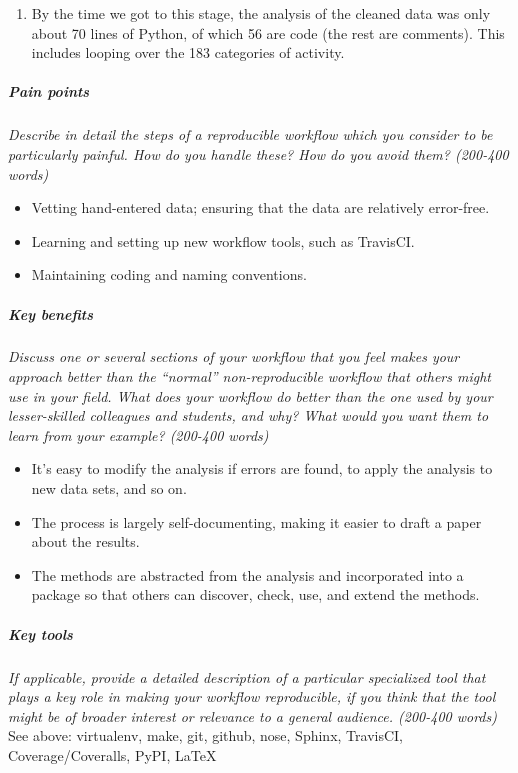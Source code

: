 \documentclass[]{article}
\begin{document}
\begin{enumerate}
  \begin{enumerate}
  \def\labelenumii{\roman{enumii}.}
  \itemsep1pt\parskip0pt
  \item
    By the time we got to this stage, the analysis of the cleaned data
    was only about 70 lines of Python, of which 56 are code (the rest
    are comments). This includes looping over the 183 categories of
    activity.
  \end{enumerate}
\end{enumerate}

\subparagraph{Pain points}\label{pain-points}

\emph{Describe in detail the steps of a reproducible workflow which you
consider to be particularly painful. How do you handle these? How do you
avoid them? (200-400 words)}

\begin{itemize}
\itemsep1pt\parskip0pt
\item
  Vetting hand-entered data; ensuring that the data are relatively
  error-free.
\item
  Learning and setting up new workflow tools, such as TravisCI.
\item
  Maintaining coding and naming conventions.
\end{itemize}

\subparagraph{Key benefits}\label{key-benefits}

\emph{Discuss one or several sections of your workflow that you feel
makes your approach better than the ``normal'' non-reproducible workflow
that others might use in your field. What does your workflow do better
than the one used by your lesser-skilled colleagues and students, and
why? What would you want them to learn from your example? (200-400
words)}

\begin{itemize}
\itemsep1pt\parskip0pt
\item
  It's easy to modify the analysis if errors are found, to apply the
  analysis to new data sets, and so on.
\item
  The process is largely self-documenting, making it easier to draft a
  paper about the results.
\item
  The methods are abstracted from the analysis and incorporated into a
  package so that others can discover, check, use, and extend the
  methods.
\end{itemize}

\subparagraph{Key tools}\label{key-tools}

\emph{If applicable, provide a detailed description of a particular
specialized tool that plays a key role in making your workflow
reproducible, if you think that the tool might be of broader interest or
relevance to a general audience. (200-400 words)} See above: virtualenv,
make, git, github, nose, Sphinx, TravisCI, Coverage/Coveralls, PyPI,
LaTeX
\end{document}
